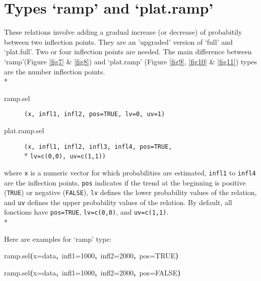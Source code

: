 \documentclass[letterpaper, 12pt]{article}
\newenvironment{Hinput}%
{}%
{}%
\newenvironment{Hchunk}%
{\vspace{0.5em}\par\begin{flushleft}}%
{\end{flushleft}}%
\newcommand{\hlnumber}[1]{\textcolor[rgb]{0.0823529411764706,0.0784313725490196,0.709803921568627}{#1}}%
\newcommand{\hlfunctioncall}[1]{\textcolor[rgb]{1,0,0}{#1}}%
\newcommand{\hlkeyword}[1]{\textcolor[rgb]{0,0,0}{\textbf{#1}}}%
\newcommand{\hlargument}[1]{\textcolor[rgb]{0.694117647058824,0.247058823529412,0.0196078431372549}{#1}}%
\newcommand{\hlsymbol}[1]{\textcolor[rgb]{0,0,0}{#1}}%
\newcommand{\hlprompt}[1]{\textcolor[rgb]{0,0,0}{#1}}%
\begin{document}

\newpage

\section{Types `ramp' and `plat.ramp'}
\noindent These relations involve adding a gradual increase (or decrease) of probabitily between two inflection points. 
They are an 'upgraded' version of `full' and `plat.full'. Two or four inflection points are needed. 
The main difference between `ramp'(Figure \ref{fig7} \& \ref{fig8}) and `plat.ramp' (Figure \ref{fig9}, \ref{fig10} \& \ref{fig11}) 
types are the number inflection points.\\*
			
\begin{description}
\item[ramp.sel]\verb#(x, infl1, infl2, pos=TRUE, lv=0, uv=1)#
\item[plat.ramp.sel]\verb#(x, infl1, infl2, infl3, infl4, pos=TRUE,# \\* \verb#lv=c(0,0), uv=c(1,1))#
\end{description}
where \verb#x# is a numeric vector for which probabilities are estimated, \verb#infl1# to \verb#infl4# are the inflection points,  \verb#pos# indicates if the trend at the beginning is positive  (\verb#TRUE#) or negative (\verb#FALSE#), \verb#lv# defines the 
lower probability values of the relation, and \verb#uv# defines the upper probability values of the relation. By default, 
all fonctions have \verb#pos=TRUE#, \verb#lv=c(0,0)#, and \verb#uv=c(1,1)#.\\*

Here are examples for `ramp' type:
\begin{Hchunk}
\begin{normalsize}
\begin{Hinput}
\ttfamily\noindent
\hlprompt{\usebox{\hlnormalsizeboxgreaterthan}{\ }}\hlfunctioncall{ramp.sel}\hlkeyword{(}\hlargument{x}\hlargument{=}\hlsymbol{data}\hlkeyword{,}{\ }\hlargument{infl1}\hlargument{=}\hlnumber{1000}\hlkeyword{,}{\ }\hlargument{infl2}\hlargument{=}\hlnumber{2000}\hlkeyword{,}{\ }\hlargument{pos}\hlargument{=}\hlnumber{TRUE}\hlkeyword{)}\mbox{}
\normalfont
\end{Hinput}


\begin{Hinput}
\ttfamily\noindent
\hlprompt{\usebox{\hlnormalsizeboxgreaterthan}{\ }}\hlfunctioncall{ramp.sel}\hlkeyword{(}\hlargument{x}\hlargument{=}\hlsymbol{data}\hlkeyword{,}{\ }\hlargument{infl1}\hlargument{=}\hlnumber{1000}\hlkeyword{,}{\ }\hlargument{infl2}\hlargument{=}\hlnumber{2000}\hlkeyword{,}{\ }\hlargument{pos}\hlargument{=}\hlnumber{FALSE}\hlkeyword{)}\mbox{}
\normalfont
\end{Hinput}


\end{normalsize}
\end{Hchunk}
\end{document}
